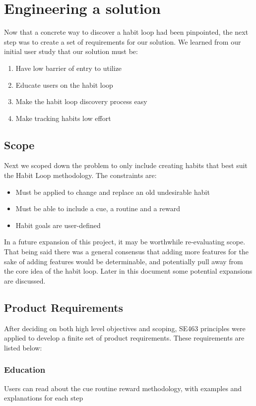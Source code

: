 \section{Engineering a solution}
Now that a concrete way to discover a habit loop had been pinpointed, the next step was to create a set of requirements for our solution. We learned from our initial user study that our solution must be:

\begin{enumerate}
    \item Have low barrier of entry to utilize
    \item Educate users on the habit loop
    \item Make the habit loop discovery process easy
    \item Make tracking habits low effort
\end{enumerate}

\subsection{Scope}
Next we scoped down the problem to only include creating habits that best suit the Habit Loop methodology. The constraints are:

\begin{itemize}
    \item Must be applied to change and replace an old undesirable habit
    \item Must be able to include a cue, a routine and a reward
    \item Habit goals are user-defined
\end{itemize}

In a future expansion of this project, it may be worthwhile re-evaluating scope. That being said there was a general consensus that adding more features for the sake of adding features would be determinable, and potentially pull away from the core idea of the habit loop. Later in this document some potential expansions are discussed.

\subsection{Product Requirements}
After deciding on both high level objectives and scoping, SE463 principles were applied to develop a finite set of product requirements. These requirements are listed below:
\subsubsection{Education}
Users can read about the cue routine reward methodology, with examples and explanations for each step
